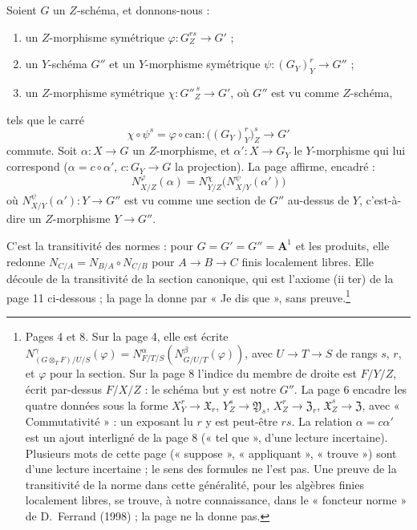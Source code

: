 \documentclass[11pt,a4paper]{article}
\begin{document}
Soient $G$ un $Z$-schéma, et donnons-nous :
\begin{enumerate}
\item[--] un $Z$-morphisme symétrique $\varphi : G^{rs}_{Z} \to G'$ ;
\item[--] un $Y$-schéma $G''$ et un $Y$-morphisme symétrique
$\psi : (G_Y)^{r}_{Y} \to G''$ ;
\item[--] un $Z$-morphisme symétrique $\chi : G''^{\,s}_{Z} \to G'$, où
$G''$ est vu comme $Z$-schéma,
\end{enumerate}
tels que le carré
\[
  \chi \circ \psi^{s} = \varphi \circ \mathrm{can} :
  \bigl((G_Y)^{r}_{Y}\bigr)^{s}_{Z} \longrightarrow G'
\]
commute. Soit $\alpha : X \to G$ un $Z$-morphisme, et
$\alpha' : X \to G_Y$ le $Y$-morphisme qui lui correspond
($\alpha = c \circ \alpha'$, $c : G_Y \to G$ la projection). La page affirme,
encadré :
\[
  \boxed{\;N^{\varphi}_{X/Z}(\alpha) =
  N^{\chi}_{Y/Z}\bigl(N^{\psi}_{X/Y}(\alpha')\bigr)\;}
\]
où $N^{\psi}_{X/Y}(\alpha') : Y \to G''$ est vu comme une section de
$G''$ au-dessus de $Y$, c'est-à-dire un $Z$-morphisme $Y \to G''$.

C'est la transitivité des normes : pour $G = G' = G'' = \mathbf{A}^{1}$ et
les produits, elle redonne $N_{C/A} = N_{B/A} \circ N_{C/B}$ pour
$A \to B \to C$ finis localement libres. Elle découle de la transitivité de
la section canonique, qui est l'axiome (ii ter) de la page 11 ci-dessous ;
la page la donne par « Je dis que », sans preuve.\footnote{Pages 4 et 8.
Sur la page 4, elle est écrite
$N^{\gamma}_{(G \otimes_T F)/U/S}(\varphi) = N^{\alpha}_{F/T/S}(N^{\beta}_{G/U/T}(\varphi))$,
avec $U \to T \to S$ de rangs $s$, $r$, et $\varphi$ pour la section. Sur la
page 8 l'indice du membre de droite est $F/Y/Z$, écrit par-dessus $F/X/Z$ :
le schéma but y est notre $G''$. La page 6 encadre les quatre données sous
la forme $X^{r}_{Y} \to \mathfrak{X}_r$, $Y^{s}_{Z} \to \mathfrak{Y}_s$,
$X^{r}_{Z} \to \mathfrak{Z}_r$, $\mathfrak{X}^{s}_{Z} \to \mathfrak{Z}$, avec
« Commutativité » : un exposant lu $r$ y est peut-être $rs$. La relation
$\alpha = c\alpha'$ est un ajout interligné de la page 8 (« tel que »,
d'une lecture incertaine). Plusieurs mots
de cette page (« suppose », « appliquant », « trouve ») sont
d'une lecture incertaine ; le sens des formules ne l'est pas. Une preuve de
la transitivité de la norme dans cette généralité, pour les algèbres finies
localement libres, se trouve, à notre connaissance, dans le « foncteur
norme » de D.~Ferrand (1998) ; la page ne la donne pas.}

\end{document}
